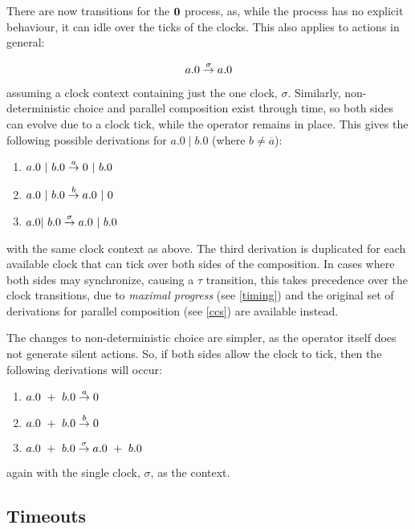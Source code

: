 There are now transitions for the $\textbf{0}$ process, as, while the
process has no explicit behaviour, it can idle over the ticks of the
clocks.  This also applies to actions in general:

\begin{equation}
a.0 \stackrel{\sigma}{\rightarrow} a.0
\end{equation}

\noindent assuming a clock context containing just the one clock,
$\sigma$. Similarly, non-deterministic choice and parallel composition
exist through time, so both sides can evolve due to a clock tick,
while the operator remains in place.  This gives the following
possible derivations for $a.0\;|\;b.0$ (where $b \ne \overline{a}$):

\begin{enumerate}
\item $a.0\ |\ b.0 \derives{a} 0\ |\ b.0$
\item $a.0\ |\ b.0 \derives{b} a.0\ |\ 0$
\item $a.0 |\ b.0 \derives{\sigma} a.0\ |\ b.0$
\end{enumerate}

\noindent with the same clock context as above.  The third derivation
is duplicated for each available clock that can tick over both sides
of the composition.  In cases where both sides may synchronize,
causing a $\tau$ transition, this takes precedence over the clock
transitions, due to \emph{maximal progress} (see \ref{timing}) and the
original set of derivations for parallel composition (see \ref{ccs})
are available instead.

The changes to non-deterministic choice are simpler, as the operator itself
does not generate silent actions.  So, if both sides allow the clock to tick,
then the following derivations will occur:

\begin{enumerate}
\item $a.0\ +\ b.0 \stackrel{a}{\rightarrow} 0$
\item $a.0\ +\ b.0 \stackrel{b}{\rightarrow} 0$
\item $a.0\ +\ b.0 \derives{\sigma} a.0\ +\ b.0$
\end{enumerate}

\noindent again with the single clock, $\sigma$, as the context.

\subsection{Timeouts}

